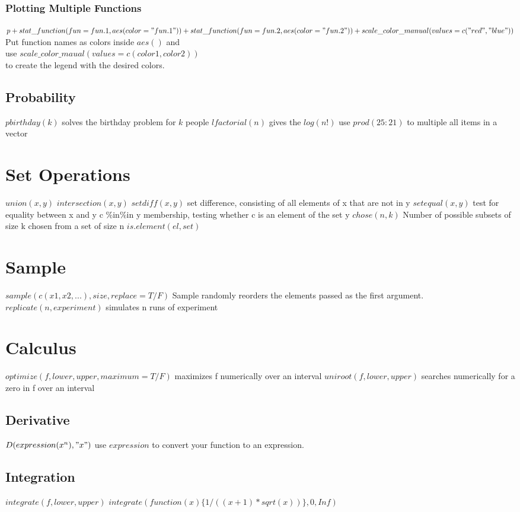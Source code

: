 \documentclass[openany]{book}
\begin{document}
\begin{flushleft}
\subsubsection{Plotting Multiple Functions}
 $p + stat\_function(fun = fun.1, aes(color = "fun.1")) + stat\_function(fun = fun.2, aes(color = "fun.2"))+scale\_color\_manual(values = c("red", "blue"))$ \medbreak
 Put function names as colors inside $aes()$ and \\
 use $scale\_color\_maual(values=c(color1,color2))$\\
 to create the legend with the desired colors.
\subsection{Probability}
$pbirthday(k)$ solves the birthday problem for $k$ people \medbreak
$lfactorial(n)$ gives the $log(n!)$ \medbreak
use $prod(25:21)$ to multiple all items in a vector
\section{Set Operations}
$union(x,y)$ \medbreak
$intersection(x,y)$ \medbreak
$setdiff(x,y)$ set difference, consisting of all elements of x that are not in y \medbreak
$setequal(x,y)$ test for equality between x and y \medbreak
c \%in\%in y membership, testing whether c is an element of the set y \medbreak
$chose(n,k)$ Number of possible subsets of size k chosen from a set of size n \medbreak
$is.element(el,set)$
\section{Sample}
$sample(c(x1,x2,...),size,replace=T/F)$ \medbreak
Sample randomly reorders the elements passed as the first argument. \medbreak
$replicate(n,experiment)$ simulates n runs of experiment
\section{Calculus}
$optimize(f,lower,upper,maximum=T/F)$ maximizes f numerically over an interval \medbreak
$uniroot(f, lower,upper)$ searches numerically for a zero in f over an interval \medbreak
\subsection{Derivative}
$D(expression(x^n),"x")$ \medbreak
use $expression$ to convert your function to an expression.
\subsection{Integration}
$integrate(f,lower,upper)$ \medbreak
$integrate(function(x) \{1/((x+1)*sqrt(x))\},0,Inf)$
 

\end{flushleft}
\end{document}
